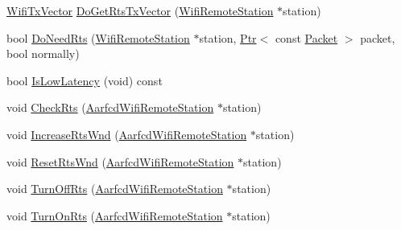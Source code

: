 \begin{DoxyCompactItemize}
\item 
\hyperlink{classns3_1_1WifiTxVector}{Wifi\+Tx\+Vector} \hyperlink{classns3_1_1AarfcdWifiManager_a4c4e397e54ae8ff36a90a1e044825586}{Do\+Get\+Rts\+Tx\+Vector} (\hyperlink{structns3_1_1WifiRemoteStation}{Wifi\+Remote\+Station} $\ast$station)
\item 
bool \hyperlink{classns3_1_1AarfcdWifiManager_a88bf14102ad07979e8137b6d4867d25b}{Do\+Need\+Rts} (\hyperlink{structns3_1_1WifiRemoteStation}{Wifi\+Remote\+Station} $\ast$station, \hyperlink{classns3_1_1Ptr}{Ptr}$<$ const \hyperlink{classns3_1_1Packet}{Packet} $>$ packet, bool normally)
\item 
bool \hyperlink{classns3_1_1AarfcdWifiManager_af16ad7a37a76971311e65f529c2df087}{Is\+Low\+Latency} (void) const 
\item 
void \hyperlink{classns3_1_1AarfcdWifiManager_ae5874a6eb640c1873aa0f1b3da958be0}{Check\+Rts} (\hyperlink{structns3_1_1AarfcdWifiRemoteStation}{Aarfcd\+Wifi\+Remote\+Station} $\ast$station)
\item 
void \hyperlink{classns3_1_1AarfcdWifiManager_afb01eeaa098032d4b0433a75e72de71d}{Increase\+Rts\+Wnd} (\hyperlink{structns3_1_1AarfcdWifiRemoteStation}{Aarfcd\+Wifi\+Remote\+Station} $\ast$station)
\item 
void \hyperlink{classns3_1_1AarfcdWifiManager_a058177eefb3e0938db7a6dae911d4f1b}{Reset\+Rts\+Wnd} (\hyperlink{structns3_1_1AarfcdWifiRemoteStation}{Aarfcd\+Wifi\+Remote\+Station} $\ast$station)
\item 
void \hyperlink{classns3_1_1AarfcdWifiManager_a6d7efd473f4ea360b0f95895d91e5e1e}{Turn\+Off\+Rts} (\hyperlink{structns3_1_1AarfcdWifiRemoteStation}{Aarfcd\+Wifi\+Remote\+Station} $\ast$station)
\item 
void \hyperlink{classns3_1_1AarfcdWifiManager_a7c0735a4d35702f34551d000808d9875}{Turn\+On\+Rts} (\hyperlink{structns3_1_1AarfcdWifiRemoteStation}{Aarfcd\+Wifi\+Remote\+Station} $\ast$station)
\end{DoxyCompactItemize}
